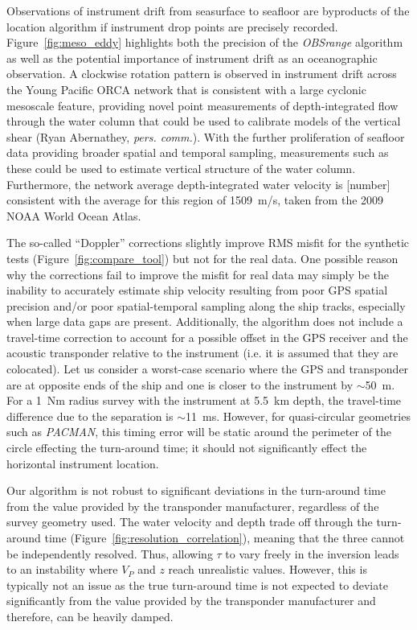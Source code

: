 Observations of instrument drift from seasurface to seafloor are byproducts of the location algorithm if instrument drop points are precisely recorded. Figure~\ref{fig:meso_eddy} highlights both the precision of the \textit{OBSrange} algorithm as well as the potential importance of instrument drift as an oceanographic observation. A clockwise rotation pattern is observed in instrument drift across the Young Pacific ORCA network that is consistent with a large cyclonic mesoscale feature, providing novel point measurements of depth-integrated flow through the water column that could be used to calibrate models of the vertical shear (Ryan Abernathey, \textit{pers. comm.}). With the further proliferation of seafloor data providing broader spatial and temporal sampling, measurements such as these could be used to estimate vertical structure of the water column. Furthermore, the network average depth-integrated water velocity is [number] consistent with the average for this region of 1509~m/s, taken from the 2009 NOAA World Ocean Atlas.

The so-called ``Doppler'' corrections slightly improve RMS misfit for the synthetic tests (Figure~\ref{fig:compare_tool}) but not for the real data. One possible reason why the corrections fail to improve the misfit for real data may simply be the inability to accurately estimate ship velocity resulting from poor GPS spatial precision and/or poor spatial-temporal sampling along the ship tracks, especially when large data gaps are present. Additionally, the algorithm does not include a travel-time correction to account for a possible offset in the GPS receiver and the acoustic transponder relative to the instrument (i.e. it is assumed that they are colocated). Let us consider a worst-case scenario where the GPS and transponder are at opposite ends of the ship and one is closer to the instrument by $\sim$50~m. For a 1~Nm radius survey with the instrument at 5.5~km depth, the travel-time difference due to the separation is $\sim$11~ms. However, for quasi-circular geometries such as \textit{PACMAN}, this timing error will be static around the perimeter of the circle effecting the turn-around time; it should not significantly effect the horizontal instrument location.

Our algorithm is not robust to significant deviations in the turn-around time from the value provided by the transponder manufacturer, regardless of the survey geometry used. The water velocity and depth trade off through the turn-around time (Figure~\ref{fig:resolution_correlation}), meaning that the three cannot be independently resolved. Thus, allowing $\tau$ to vary freely in the inversion leads to an instability where $V_P$ and $z$ reach unrealistic values. However, this is typically not an issue as the true turn-around time is not expected to deviate significantly from the value provided by the transponder manufacturer and therefore, can be heavily damped.